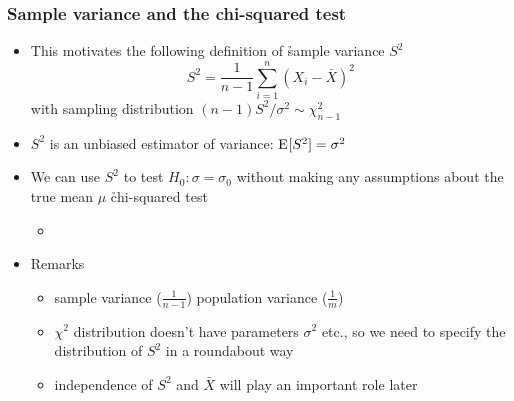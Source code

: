 \documentclass[t]{beamer} %
\begin{document}
\begin{frame}
  \frametitle{Sample variance and the chi-squared test}

  \begin{itemize}
  \item This motivates the following definition of \h{sample variance} $S^2$
    \[
    S^2 = \frac{1}{n-1} \sum_{i=1}^n (X_i - \bar{X})^2
    \]
    with sampling distribution $(n-1) S^2 / \sigma^2 \sim \chi^2_{n-1}$
  \item $S^2$ is an unbiased estimator of variance: $\mathrm{E}_{}[S^2] = \sigma^2$
    \pause
  \item We can use $S^2$ to test $H_0: \sigma = \sigma_0$ without making any
    assumptions about the true mean $\mu$ \so \h{chi-squared test}
    \begin{itemize}
    \item[]
    \end{itemize}
  \item Remarks
    \begin{itemize}
    \item sample variance ($\frac{1}{n-1}$) \vs population variance ($\frac{1}{m}$)
    \item $\chi^2$ distribution doesn't have parameters $\sigma^2$ etc., so we
      need to specify the distribution of $S^2$ in a roundabout way
    \item independence of $S^2$ and $\bar{X}$ will play an important role later
    \end{itemize}
  \end{itemize}
\end{frame}

\end{document}
